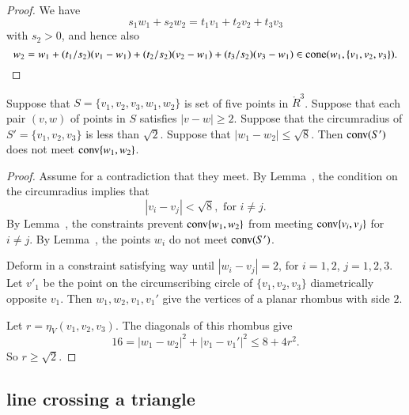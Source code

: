 \begin{proof}
We have 
  $$
  s_1 w_1 + s_2 w_2 = t_1 v_1 + t_2 v_2 + t_3 v_3
  $$
with $s_2>0$,
and hence also
  $$
  w_2 = w_1 + (t_1/s_2) (v_1-w_1) + 
       (t_2/s_2) (v_2 - w_1) + (t_3/s_2) (v_3-w_1)\in 
   {\operatorname{cone}}(w_1,\{v_1,v_2,v_3\}).
  $$
\end{proof}


\newpage
\begin{lemma}
Suppose that  $S=\{v_1,v_2,v_3,w_1,w_2\}$
is set of five points in $\ring{R}^3$.  
Suppose that each pair $(v,w)$ of points
in $S$ satisfies $|v-w|\ge 2$.
Suppose that the circumradius of $S'=\{v_1,v_2,v_3\}$ is less than
$\sqrt2$.  Suppose that $|w_1-w_2|\le \sqrt8$.  Then
${\operatorname{conv}}(S')$ does not meet ${\operatorname{conv}}\{w_1,w_2\}$.
\end{lemma}

\begin{proof}  Assume for a contradiction that they meet. 
By Lemma~, the condition on the circumradius implies that
	$$|v_i-v_j| < \sqrt8, \text{ for } i\ne j.$$
By Lemma~, the constraints prevent 	${\operatorname{conv}}\{w_1,w_2\}$
from meeting ${\operatorname{conv}}\{v_i,v_j\}$ for $i\ne j$.  By Lemma~,
the points $w_i$ do not meet ${\operatorname{conv}}(S')$.

Deform in a constraint satisfying way until $|w_i-v_j|=2$, for
$i=1,2$, $j=1,2,3$.    Let $v'_1$ be the
point on the circumscribing circle of $\{v_1,v_2,v_3\}$ diametrically
opposite $v_1$.  Then $w_1,w_2,v_1,v_1'$ give the vertices of a planar
rhombus with side $2$.

Let $r=\eta_V(v_1,v_2,v_3)$. The diagonals of this rhombus give
   $$
   16 = |w_1-w_2|^2 + |v_1-v_1'|^2 \le 8 + 4 r^2.
   $$
So $r\ge\sqrt2$.
\end{proof}

\newpage


\subsection{line crossing a triangle}

